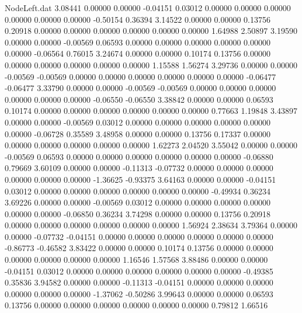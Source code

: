 \begin{filecontents}{NodeLeft.dat}
   3.08441    0.00000    0.00000    -0.04151    0.03012    0.00000    0.00000    0.00000    0.00000    0.00000    0.00000   -0.50154    0.36394
   3.14522    0.00000    0.00000     0.13756    0.20918    0.00000    0.00000    0.00000    0.00000    0.00000    0.00000    1.64988    2.50897
   3.19590    0.00000    0.00000    -0.00569    0.06593    0.00000    0.00000    0.00000    0.00000    0.00000    0.00000   -0.06564    0.76015
   3.24674    0.00000    0.00000     0.10174    0.13756    0.00000    0.00000    0.00000    0.00000    0.00000    0.00000    1.15588    1.56274
   3.29736    0.00000    0.00000    -0.00569   -0.00569    0.00000    0.00000    0.00000    0.00000    0.00000    0.00000   -0.06477   -0.06477
   3.33790    0.00000    0.00000    -0.00569   -0.00569    0.00000    0.00000    0.00000    0.00000    0.00000    0.00000   -0.06550   -0.06550
   3.38842    0.00000    0.00000     0.06593    0.10174    0.00000    0.00000    0.00000    0.00000    0.00000    0.00000    0.77663    1.19848
   3.43897    0.00000    0.00000    -0.00569    0.03012    0.00000    0.00000    0.00000    0.00000    0.00000    0.00000   -0.06728    0.35589
   3.48958    0.00000    0.00000     0.13756    0.17337    0.00000    0.00000    0.00000    0.00000    0.00000    0.00000    1.62273    2.04520
   3.55042    0.00000    0.00000    -0.00569    0.06593    0.00000    0.00000    0.00000    0.00000    0.00000    0.00000   -0.06880    0.79669
   3.60109    0.00000    0.00000    -0.11313   -0.07732    0.00000    0.00000    0.00000    0.00000    0.00000    0.00000   -1.36625   -0.93375
   3.64163    0.00000    0.00000    -0.04151    0.03012    0.00000    0.00000    0.00000    0.00000    0.00000    0.00000   -0.49934    0.36234
   3.69226    0.00000    0.00000    -0.00569    0.03012    0.00000    0.00000    0.00000    0.00000    0.00000    0.00000   -0.06850    0.36234
   3.74298    0.00000    0.00000     0.13756    0.20918    0.00000    0.00000    0.00000    0.00000    0.00000    0.00000    1.56924    2.38634
   3.79364    0.00000    0.00000    -0.07732   -0.04151    0.00000    0.00000    0.00000    0.00000    0.00000    0.00000   -0.86773   -0.46582
   3.83422    0.00000    0.00000     0.10174    0.13756    0.00000    0.00000    0.00000    0.00000    0.00000    0.00000    1.16546    1.57568
   3.88486    0.00000    0.00000    -0.04151    0.03012    0.00000    0.00000    0.00000    0.00000    0.00000    0.00000   -0.49385    0.35836
   3.94582    0.00000    0.00000    -0.11313   -0.04151    0.00000    0.00000    0.00000    0.00000    0.00000    0.00000   -1.37062   -0.50286
   3.99643    0.00000    0.00000     0.06593    0.13756    0.00000    0.00000    0.00000    0.00000    0.00000    0.00000    0.79812    1.66516

\end{filecontents}
